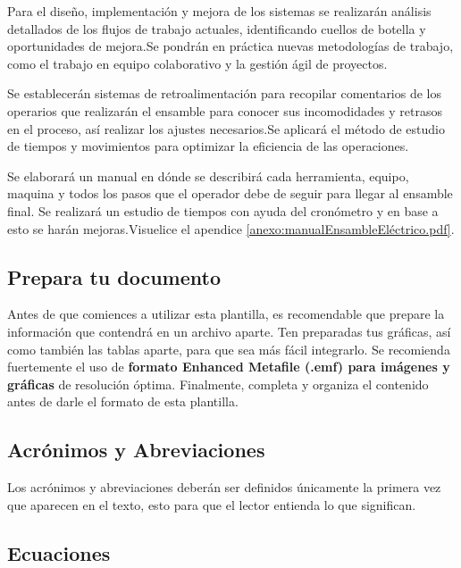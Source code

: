     
    Para el diseño, implementación y mejora de los sistemas se realizarán análisis detallados de los flujos de trabajo actuales, identificando cuellos de botella y oportunidades de mejora.Se pondrán en práctica nuevas metodologías de trabajo, como el trabajo en equipo colaborativo y la gestión ágil de proyectos.
    
    
    Se establecerán sistemas de retroalimentación para recopilar comentarios de los operarios que realizarán el ensamble para conocer sus incomodidades y retrasos en el proceso, así realizar los ajustes necesarios.Se aplicará el método de estudio de tiempos y movimientos para optimizar la eficiencia de las operaciones.
    
    Se elaborará un manual en dónde se describirá cada herramienta, equipo, maquina y todos los pasos que el operador debe de seguir para llegar al ensamble final. Se realizará un estudio de tiempos con ayuda del cronómetro y en base a esto se harán mejoras.Visuelice el apendice \ref{anexo:manualEnsambleEléctrico.pdf}.
    
    
    

    

    
    \subsection{Prepara tu documento}
    
    Antes de que comiences a utilizar esta plantilla, es recomendable que prepare la información que contendrá en un archivo aparte. 
    Ten preparadas tus gráficas, así como también las tablas aparte, para que sea más fácil integrarlo. 
    Se recomienda fuertemente el uso de \textbf{formato Enhanced Metafile (.emf) para imágenes y gráficas} de resolución óptima. 
    Finalmente, completa y organiza el contenido antes de darle el formato de esta plantilla. 
    
    \subsection{Acrónimos y Abreviaciones}
    
    Los acrónimos y abreviaciones deberán ser definidos únicamente la primera vez que aparecen en el texto, esto para que el lector entienda lo que significan.
    
    \subsection{Ecuaciones}
    
